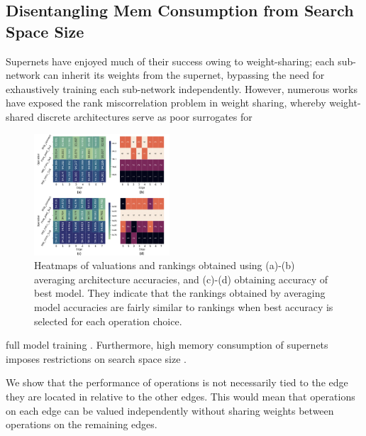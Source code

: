 \documentclass[onecolumn]{IEEEtran}
\begin{document}
\subsection{Disentangling Mem Consumption from Search Space Size}
Supernets have enjoyed much of their success owing to weight-sharing; each sub-network can inherit its weights from the supernet, bypassing the need for exhaustively training each sub-network independently. However, numerous works have exposed the rank miscorrelation problem in weight sharing, whereby weight-shared discrete architectures serve as poor surrogates for 
\begin{figure}[ht]
	\centering
	\includegraphics[width=0.45\textwidth]{Figure-3.png}
	\caption{Heatmaps of valuations and rankings obtained using (a)-(b) averaging architecture accuracies, and (c)-(d) obtaining accuracy of best model. They indicate that the rankings obtained by averaging model accuracies are fairly similar to rankings when best accuracy is selected for each operation choice.}
	\label{fig:heatmaps}
\end{figure}
full model training \cite{Zela2020, Zhang2020, Pourchot2020}. Furthermore, high memory consumption of supernets imposes restrictions on search space size \cite{Cai2018, Xu2019}. 

We show that the performance of operations is not necessarily tied to the edge they are located in relative to the other edges. This would mean that operations on each edge can be valued independently without sharing weights between operations on the remaining edges. 
\end{document}
